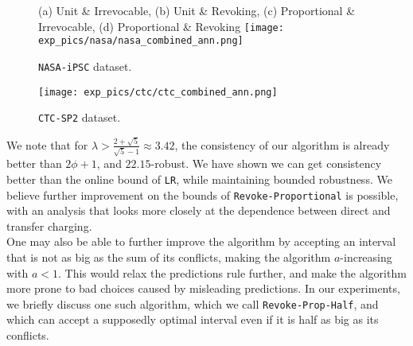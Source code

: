 \begin{figure*}[t!]
\centering
\caption{\texttt{NASA-iPSC} dataset.} (a) Unit \& Irrevocable, (b) Unit \& Revoking, (c) Proportional \& Irrevocable, (d) Proportional \& Revoking
\texttt{[image: exp\_pics/nasa/nasa\_combined\_ann.png]}
\label{fig:nasa_exps}
\end{figure*}
\begin{figure*}[t!]
\centering
\caption{\texttt{CTC-SP2} dataset.}
\texttt{[image: exp\_pics/ctc/ctc\_combined\_ann.png]}
\label{fig:ctc_exps}
\end{figure*}

We note that for $\lambda > \frac{2+\sqrt{5}}{\sqrt{5} -1}\approx 3.42 $, the consistency of our algorithm is already better than $2\phi + 1$, and $22.15$-robust. We have shown we can get consistency better than the online bound of \texttt{LR}, while maintaining bounded robustness. We believe further improvement on the bounds of \texttt{Revoke-Proportional} is possible, with an analysis that looks more closely at the dependence between direct and transfer charging.\\
One may also be able to further improve the algorithm by accepting an interval that is not as big as the sum of its conflicts, making the algorithm $a$-increasing with $a<1$. This would relax the predictions rule further, and make the algorithm more prone to bad choices caused by misleading predictions. In our experiments, we briefly discuss one such algorithm, which we call \texttt{Revoke-Prop-Half}, and which can accept a supposedly optimal interval even if it is half as big as its conflicts.






